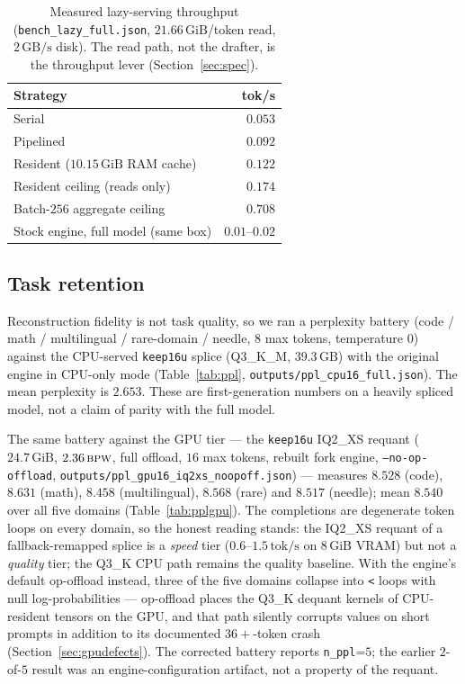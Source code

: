 \documentclass[11pt]{article}
\newcommand{\keepm}[1]{\texttt{keep#1}}
\newcommand{\code}[1]{\texttt{#1}}
\newcommand{\bpw}{\,\textsc{bpw}}
\newcommand{\gib}{\,\textrm{GiB}}
\newcommand{\gb}{\,\textrm{GB}}
\newcommand{\tps}{\,\textrm{tok/s}}
\begin{document}
\begin{table}[t]
\centering
\small
\begin{tabular}{lr}
\toprule
\textbf{Strategy} & \textbf{tok/s} \\
\midrule
Serial                              & $0.053$ \\
Pipelined                           & $0.092$ \\
Resident ($10.15\gib{}$ RAM cache)   & $0.122$ \\
Resident ceiling (reads only)       & $0.174$ \\
Batch-$256$ aggregate ceiling        & $0.708$ \\
\midrule
Stock engine, full model (same box) & $0.01$--$0.02$ \\
\bottomrule
\end{tabular}
\caption{Measured lazy-serving throughput (\code{bench\_lazy\_full.json},
$21.66\gib{}$/token read, $2\gb{}/\textrm{s}$ disk). The read path, not the
drafter, is the throughput lever (Section~\ref{sec:spec}).}
\label{tab:bandwidth}
\end{table}

\subsection{Task retention}

Reconstruction fidelity is not task quality, so we ran a perplexity battery
(code / math / multilingual / rare-domain / needle, $8$ max tokens, temperature
$0$) against the CPU-served \keepm{16u} splice (Q3\_K\_M, $39.3\gb{}$) with the
original engine in CPU-only mode (Table~\ref{tab:ppl},
\code{outputs/ppl\_cpu16\_full.json}). The mean perplexity is $2.653$. These are
first-generation numbers on a heavily spliced model, not a claim of parity with
the full model.

The same battery against the GPU tier --- the \keepm{16u} IQ2\_XS requant
($24.7\gib{}$, $2.36\bpw$, full offload, $16$ max tokens, rebuilt fork engine,
\code{--no-op-offload}, \code{outputs/ppl\_gpu16\_iq2xs\_noopoff.json}) ---
measures $8.528$ (code), $8.631$ (math), $8.458$ (multilingual), $8.568$
(rare) and $8.517$ (needle); mean $8.540$ over all five domains
(Table~\ref{tab:pplgpu}). The completions are degenerate token loops on every
domain, so the honest reading stands: the IQ2\_XS requant of a
fallback-remapped splice is a \emph{speed} tier
($0.6$--$1.5\tps$ on $8\gib{}$ VRAM) but not a \emph{quality} tier; the Q3\_K
CPU path remains the quality baseline. With the engine's default op-offload
instead, three of the five domains collapse into \code{<} loops with null
log-probabilities --- op-offload places the Q3\_K dequant kernels of
CPU-resident tensors on the GPU, and that path silently corrupts values on
short prompts in addition to its documented $36{+}$-token crash
(Section~\ref{sec:gpudefects}). The corrected battery reports
\code{n\_ppl}=$5$; the earlier $2$-of-$5$ result was an engine-configuration
artifact, not a property of the requant.
\end{document}

